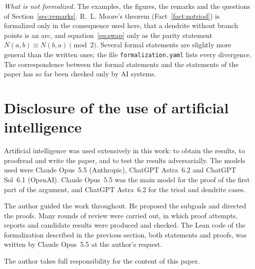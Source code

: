 \documentclass[11pt]{amsart}
\theoremstyle{definition}
\theoremstyle{remark}
\newcommand{\N}{N}
\begin{document}
\emph{What is not formalized.} The examples, the figures, the remarks and the questions of Section~\ref{sec:remarks}. R.~L. Moore's theorem (Fact~\ref{fact:notriod}) is formalized only in the consequence used here, that a dendrite without branch points is an arc, and equation~\eqref{eq:swap} only as the parity statement $\N(a,b)\equiv\N(b,a)\pmod 2$. Several formal statements are slightly more general than the written ones; the file \texttt{formalization.yaml} lists every divergence. The correspondence between the formal statements and the statements of the paper has so far been checked only by AI systems.

\section*{Disclosure of the use of artificial intelligence}

Artificial intelligence was used extensively in this work: to obtain the results, to proofread and write the paper, and to test the results adversarially. The models used were Claude Opus~5.5 (Anthropic), ChatGPT Astra~6.2 and ChatGPT Sol~6.1 (OpenAI). Claude Opus~5.5 was the main model for the proof of the first part of the argument, and ChatGPT Astra~6.2 for the triod and dendrite cases.

The author guided the work throughout. He proposed the subgoals and directed the proofs. Many rounds of review were carried out, in which proof attempts, reports and candidate results were produced and checked. The Lean code of the formalization described in the previous section, both statements and proofs, was written by Claude Opus~5.5 at the author's request.\par The author takes full responsibility for the content of this paper.
\end{document}
